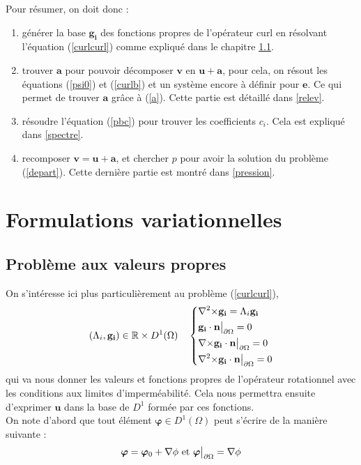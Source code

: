 Pour résumer, on doit donc :
\begin{enumerate}
\item générer la base $\mathbf{g_i}$ des fonctions propres de l'opérateur curl en résolvant l'équation (\ref{curlcurl}) comme expliqué dans le chapitre \ref{eigen}.
\item trouver $\mathbf{a}$ pour pouvoir décomposer $\mathbf{v}$ en $\mathbf{u}+\mathbf{a}$, pour cela, on résout les équations (\ref{psi0}) et (\ref{curlb}) et un système encore à définir pour $\mathbf{e}$. Ce qui permet de trouver $\mathbf{a}$ grâce à (\ref{a}). Cette partie est détaillé dans \ref{relev}.
\item résoudre l'équation (\ref{pbc}) pour trouver les coefficients $c_i$. Cela est expliqué dans \ref{spectre}.
\item recomposer $\mathbf{v}=\mathbf{u}+\mathbf{a}$, et chercher $p$ pour avoir la solution du problème (\ref{depart}). Cette dernière partie est montré dans \ref{pression}.
\end{enumerate}

\chapter{Formulations variationnelles}
\label{fv}
\section{Problème aux valeurs propres}
\label{eigen}
On s'intéresse ici plus particulièrement au problème (\ref{curlcurl}),
\begin{equation}\label{pbeigen}
(\Lambda_i,\mathbf{g_i})\in{\mathbb{R}}\times D^1(\Omega)\quad \left\{\begin{aligned}
&{\nabla^2\times}  \mathbf{g_i} = \Lambda_i \mathbf{g_i}\\
&\mathbf{g_i}\cdot \mathbf{n}{\big\rvert_{\partial\Omega}} = 0\\
&{\nabla\times} \mathbf{g_i}\cdot \mathbf{n}{\big\rvert_{\partial\Omega}} = 0\\
&{\nabla^2\times}  \mathbf{g_i}\cdot \mathbf{n}{\big\rvert_{\partial\Omega}} = 0
\end{aligned}\right.
\end{equation}
qui va nous donner les valeurs et fonctions propres de l'opérateur rotationnel avec les conditions aux limites d'imperméabilité. Cela nous permettra ensuite d'exprimer $\mathbf{u}$ dans la base de $D^1$ formée par ces fonctions.\\

On note d'abord que tout élément $\bm{\varphi}\in D^1(\Omega)$ peut s'écrire de la manière suivante :
\[ \bm{\varphi} = \bm{\varphi}_0 + {\nabla}\phi\text{ et } \bm{\varphi}{\big\rvert_{\partial\Omega}} = {\nabla}\phi \]

